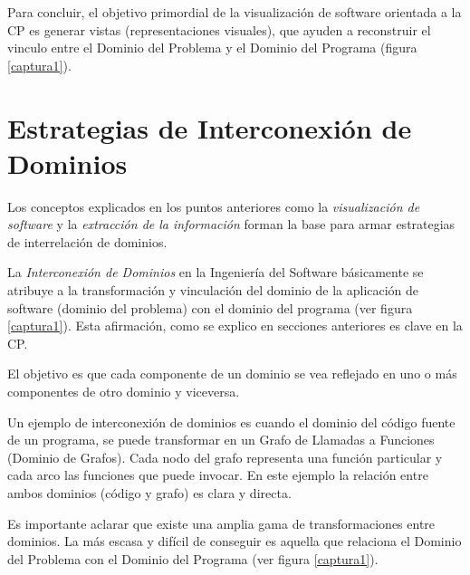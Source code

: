 \documentclass[a4paper,12pt]{report}
\begin{document}
Para concluir, el objetivo primordial de la visualización de software orientada a la CP es generar vistas (representaciones visuales), que ayuden a reconstruir el vinculo entre el Dominio del Problema y el Dominio del Programa (figura \ref{captura1}). 


\section{Estrategias de Interconexión de \\Dominios}

Los conceptos explicados en los puntos anteriores como la \textit{visualización de software} y la \textit{extracción de la información} forman la base para armar estrategias de interrelación de dominios.

La \textit{Interconexión de Dominios} \cite{BRM10,MBPHRU10} en la Ingeniería del Software básicamente se atribuye a la transformación y vinculación del dominio de la aplicación de software (dominio del problema) con el dominio del programa (ver figura \ref{captura1}). Esta afirmación, como se explico en secciones anteriores es clave en la CP.

El objetivo es que cada componente de un dominio se vea reflejado en uno o más componentes de otro dominio y viceversa.%


Un ejemplo de interconexión de dominios es cuando el dominio del código fuente de un programa, se puede transformar en un Grafo de Llamadas a Funciones (Dominio de Grafos). Cada nodo del grafo representa una función particular y cada arco las funciones que puede invocar. En este ejemplo la relación entre ambos dominios (código y grafo) es clara y directa. 

Es importante aclarar que existe una amplia gama de transformaciones entre dominios. La más escasa y difícil de conseguir es aquella que relaciona el Dominio del Problema con el Dominio del Programa (ver figura \ref{captura1}).
\end{document}
